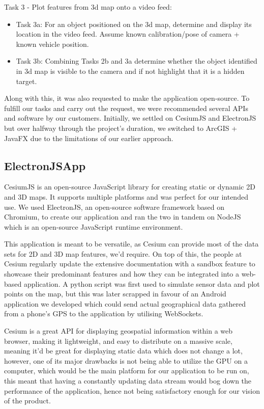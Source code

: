 \documentclass{l3proj}
\begin{document}
Task 3 - Plot features from 3d map onto a video feed:
\begin{itemize}
	\item Task 3a: For an object positioned on the 3d map, determine and display its location in the video feed. Assume known calibration/pose of camera + known vehicle position. 
	\item Task 3b: Combining Tasks 2b and 3a determine whether the object identified in 3d map is visible to the camera and if not highlight that it is a hidden target.   
\end{itemize}

Along with this, it was also requested to make the application open-source. To fulfill our tasks and carry out the request, we were recommended several APIs and software by our customers. Initially, we settled on CesiumJS and ElectronJS but over halfway through the project’s duration, we switched to ArcGIS + JavaFX due to the limitations of our earlier approach.

\subsection{ElectronJSApp}

CesiumJS\cite{cesium} is an open-source JavaScript library for creating static or dynamic 2D and 3D maps. It supports multiple platforms and was perfect for our intended use. We used ElectronJS\cite{electron}, an open-source software framework based on Chromium, to create our application and ran the two in tandem on NodeJS\cite{node} which is an open-source JavaScript runtime environment.

This application is meant to be versatile, as Cesium can provide most of the data sets for 2D and 3D map features, we'd require. On top of this, the people at Cesium regularly update the extensive documentation with a sandbox feature to showcase their predominant features and how they can be integrated into a web-based application. A python script was first used to simulate sensor data and plot points on the map, but this was later scrapped in favour of an Android application we developed which could send actual geographical data gathered from a phone’s GPS to the application by utilising WebSockets.

Cesium is a great API for displaying geospatial information within a web browser, making it lightweight, and easy to distribute on a massive scale, meaning it'd be great for displaying static data which does not change a lot, however, one of its major drawbacks is not being able to utilize the GPU on a computer, which would be the main platform for our application to be run on, this meant that having a constantly updating data stream would bog down the performance of the application, hence not being satisfactory enough for our vision of the product.
\end{document}
